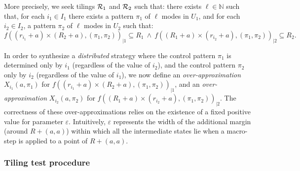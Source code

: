 More precisely, we seek tilings ${\cal R}_1$ and ${\cal R}_2$ such that:
there exists $\ell\in{\mathbb N}$ such
that, for each $i_1\in I_1$ there exists a pattern
$\pi_1$ of $\ell$ modes in $U_1$,
and for each $i_2\in I_2$, 
a pattern $\pi_{2}$ 
of $\ell$ modes in $U_2$ such that:
%
\[
f((r_{i_1}+a)\times (R_2+a),(\pi_1,\pi_2))_{|1}\subseteq R_1 \ \wedge\ 
f((R_1+a)\times (r_{i_2}+a),(\pi_1,\pi_2))_{|2}\subseteq R_2.
\]


In order to synthesize a \emph{distributed} strategy where the control
pattern $\pi_1$ is determined only by $i_1$ (regardless of the value
of $i_2$), and the control pattern $\pi_2$ only by $i_2$ (regardless
of the value of $i_1$), we now define an \emph{over-approximation}
$X_{i_1}(a,\pi_1)$ for
$f((r_{i_1}+a)\times(R_2+a),(\pi_1,\pi_2))_{|1}$, and an
\emph{over-approximation} $X_{i_2}(a,\pi_2)$ for $f((R_1+a)\times
(r_{i_2}+a),(\pi_1,\pi_2))_{|2}$.  The correctness of these
over-approximations relies on the existence of a fixed positive value
for parameter $\varepsilon$.
Intuitively, $\varepsilon$ represents the width of
the additional margin (around $R+(a,a)$)
within which all the intermediate states lie when
a macro-step is applied to a point of $R+(a,a)$. 

\subsubsection{Tiling test procedure}\label{ss:macro_dist}

